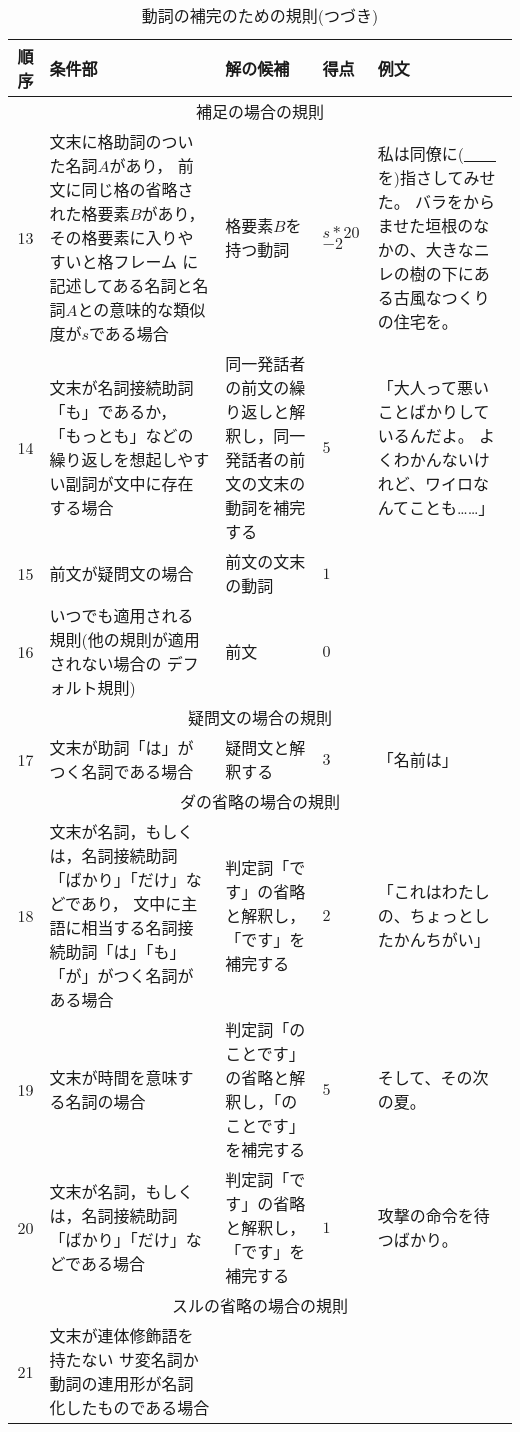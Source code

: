 \begin{table}[t]
  \footnotesize
    \addtocounter{table}{-1}
  \caption{動詞の補完のための規則(つづき)}
  \begin{center}
\begin{tabular}[c]{|@{ }r@{ }|p{4cm}|p{3cm}|@{ }p{0.6cm}@{ }|p{3.9cm}|}\hline
  順序  & 条件部 & 解の候補 & 得点  & 例文\\\hline
\multicolumn{5}{|c|}{補足の場合の規則}\\\hline
  13&
  文末に格助詞のついた名詞$A$があり，
  前文に同じ格の省略された格要素$B$があり，
  その格要素に入りやすいと格フレーム
  に記述してある名詞と名詞$A$との意味的な類似度が$s$である場合&
  格要素$B$を持つ動詞 &
  $s*20$ $-2$&
  私は同僚に(\underline{　　}を)指さしてみせた。
  バラをからませた垣根のなかの、大きなニレの樹の下にある古風なつくりの住宅を。
  \\
  14&
  文末が名詞接続助詞「も」であるか，
  「もっとも」などの繰り返しを想起しやすい副詞が文中に存在する場合&
  同一発話者の前文の繰り返しと解釈し，同一発話者の前文の文末の動詞を補完する&
  $5$&
  「大人って悪いことばかりしているんだよ。
  よくわかんないけれど、ワイロなんてことも……」\\
  15&
  前文が疑問文の場合&
  前文の文末の動詞&
  $1$&
  \\
  16&
  いつでも適用される規則(他の規則が適用されない場合の
  デフォルト規則)&
  前文&
  $0$&\\\hline
\multicolumn{5}{|c|}{疑問文の場合の規則}\\\hline
  17&
  文末が助詞「は」がつく名詞である場合&
  疑問文と解釈する&
  $3$&
  「名前は」\\\hline
\multicolumn{5}{|c|}{ダの省略の場合の規則}\\\hline
  18&
  文末が名詞，もしくは，名詞接続助詞「ばかり」「だけ」などであり，
  文中に主語に相当する名詞接続助詞「は」「も」「が」がつく名詞がある場合&
  判定詞「です」の省略と解釈し，「です」を補完する&
  $2$&
  「これはわたしの、ちょっとしたかんちがい」\\
  19&
  文末が時間を意味する名詞の場合&
  判定詞「のことです」の省略と解釈し，「のことです」を補完する&
  $5$&
  そして、その次の夏。\\
  20&
  文末が名詞，もしくは，名詞接続助詞「ばかり」「だけ」などである場合&
  判定詞「です」の省略と解釈し，「です」を補完する&
  $1$&
  攻撃の命令を待つばかり。
 \\\hline
\multicolumn{5}{|c|}{スルの省略の場合の規則}\\\hline
  21&
  文末が連体修飾語を持たない
  サ変名詞か動詞の連用形が名詞化したものである場合&

\end{tabular}
\end{center}
\end{table}
